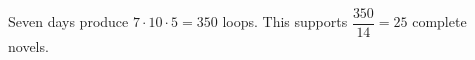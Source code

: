 Seven days produce $ 7\cdot10\cdot5=350 $ loops. This supports $\dfrac{350}{14}=\boxed{25}$ complete novels.
